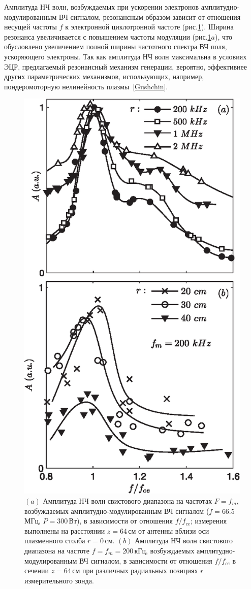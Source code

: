 \documentclass[autoref,10pt]{disser}
\begin{document}
Амплитуда НЧ волн, возбуждаемых при ускорении электронов ам\-пли\-ту\-дно-мо\-ду\-ли\-ро\-ван\-ным ВЧ сигналом, резонансным образом зависит от отношения несущей частоты $f$ к электронной циклотронной частоте (\mbox{рис.\ref{fig:param_vs_dir_res}}). Ширина резонанса увеличивается с повышением частоты модуляции (\mbox{рис.\ref{fig:param_vs_dir_res}$a$}), что обусловлено увеличением полной ширины частотного спектра ВЧ поля, ускоряющего электроны. Так как амплитуда НЧ волн максимальна в условиях ЭЦР, предлагаемый резонансный механизм генерации, вероятно, эффективнее других параметрических механизмов, использующих, например, пондеромоторную нелинейность плазмы~\ref{Gushchin}.
\begin{figure}[H]
    \begin{center}
      \includegraphics[width=0.5\columnwidth]{pics/param_vs_dir_res.eps}
      \caption{$(a)$ Амплитуда НЧ волн свистового диапазона на частотах $F=f_m$, возбуждаемых амплитудно-модулированным ВЧ сигналом ($f=66.5$\,МГц, $P=300$\,Вт), в зависимости от отношения $f/f_{ce}$; измерения выполнены на расстоянии $z=64$\,см от антенны вблизи оси плазменного столба $r=0$\,см. $(b)$ Амплитуда НЧ волн свистового диапазона на частоте $f=f_m=200$\,кГц, возбуждаемых амплитудно-модулированным ВЧ сигналом, в зависимости от отношения $f/f_{ce}$ в сечении $z=64$\,см при различных радиальных позициях $r$ измерительного зонда.}
      \label{fig:param_vs_dir_res}
    \end{center}
\end{figure}
\end{document}
